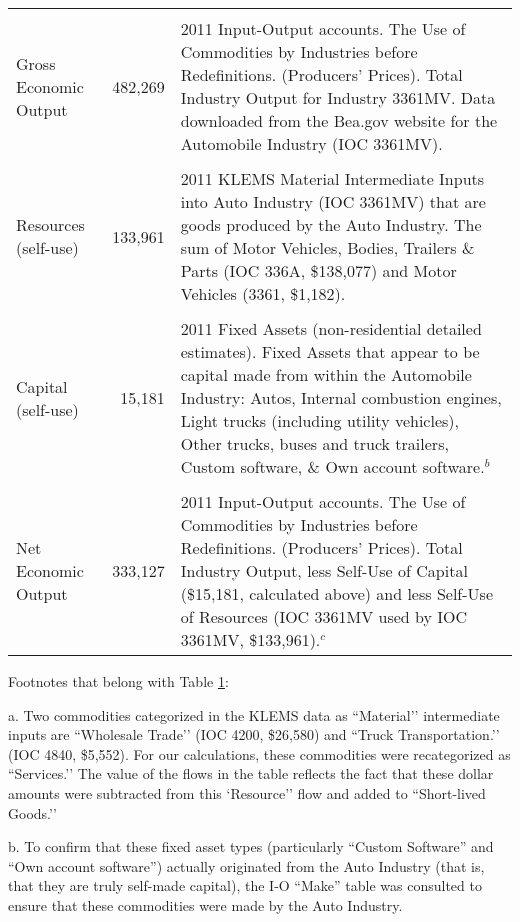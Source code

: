 \begin{table}
\begin{center}
\begin{tabular}{l r @{\hspace{2em}} p{7cm}}
&&\\
    Gross Economic Output & 482,269  &   2011 Input-Output accounts. The Use of Commodities by Industries before Redefinitions. (Producers' Prices). Total Industry Output for Industry 3361MV. Data downloaded from the Bea.gov website for the Automobile Industry (IOC 3361MV).  \\ 
&&\\
Resources (self-use) & 133,961 & 2011 KLEMS Material Intermediate Inputs into Auto Industry (IOC 3361MV) that are goods produced by the Auto Industry. The sum of Motor Vehicles, Bodies, Trailers \& Parts (IOC 336A, \$138,077) and Motor Vehicles (3361, \$1,182). \\
&&\\
    Capital (self-use) &  15,181 & 2011  Fixed Assets (non-residential detailed estimates). Fixed Assets that appear to be
capital made from within the Automobile Industry: Autos, Internal combustion engines, Light trucks (including utility vehicles), Other trucks, buses and truck trailers, Custom software, \& Own account software.$^{b}$      \\
&&\\  
    Net Economic Output & 333,127   &   2011 Input-Output accounts. The Use of Commodities by Industries before Redefinitions. (Producers' Prices). Total Industry Output, less Self-Use of Capital (\$15,181, calculated above) and less Self-Use of Resources (IOC 3361MV used by IOC 3361MV, \$133,961).$^{c}$  \\
    \bottomrule
  \end{tabular}
\end{center}

\label{tab:calculations}
\end{table}

Footnotes that belong with Table \ref{tab:calculations}:


\footnotesize{a. Two commodities categorized in the KLEMS data as ``Material’’ intermediate inputs
 are ``Wholesale Trade’’ (IOC 4200, \$26,580) and ``Truck Transportation.’’ (IOC 4840, \$5,552). 
For our calculations, these commodities were recategorized as ``Services.’’
 The value of the flows in the table reflects the fact that these dollar amounts were subtracted from this `Resource’’ flow and added to ``Short-lived Goods.’’}



\footnotesize{b. To confirm that these fixed asset types (particularly ``Custom Software'' and ``Own account software'')
 actually originated from the Auto Industry (that is, that they are truly self-made capital), the I-O ``Make'' table was consulted to ensure 
that these commodities were made by the Auto Industry.}



